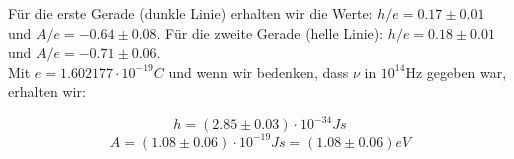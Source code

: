 \documentclass[12pt,a4paper,twopage]{article}
\begin{document}
Für die erste Gerade (dunkle Linie) erhalten wir die Werte: $h/e=0.17 \pm 0.01$ und $A/e=-0.64 \pm 0.08$. Für die zweite Gerade (helle Linie): $h/e=0.18 \pm 0.01$ und $A/e=-0.71 \pm 0.06$.\\
Mit $e=1.602177 \cdot 10^{-19}C$ und wenn wir bedenken, dass $\nu$ in $10^{14}$Hz gegeben war, erhalten wir:

$$\boxed{h=(2.85 \pm 0.03)\cdot 10^{-34}Js}$$
$$\boxed{A=(1.08 \pm 0.06)\cdot 10^{-19}Js=(1.08 \pm 0.06)eV}$$


%
%

\end{document}
